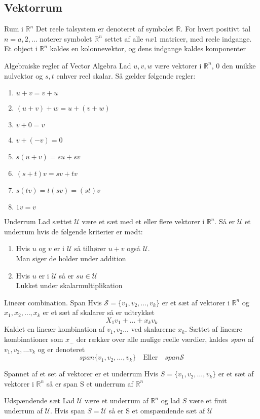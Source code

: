 \documentclass[a4paper,fleqn]{article}
\newcommand{\RR}{\mathbb{R}}
\newcommand{\U}{\mathcal{U}}
\begin{document}
	\subsection{Vektorrum}
	\begin{definition}{Rum i $\RR^n$}{}
		Det reele talsystem er denoteret af symbolet $\RR$. For hvert positivt tal
		$n = a,2,\dots$ noterer symbolet $\RR^n$ settet af alle $n x 1$ matricer, med
		reele indgange. Et object i $\RR^n$ kaldes en kolonnevektor, og dens indgange
		kaldes komponenter
	\end{definition}
	\begin{theorem}{Algebraiske regler af Vector Algebra}{}
		Lad $u,v,w$ være vektorer i $\RR^n$, $0$ den unikke nulvektor og $s,t$ enhver reel
		skalar. Så gælder følgende regler:
		\begin{enumerate}
			\item $u + v = v + u$
			\item $(u+v)+w = u + (v + w)$
			\item $v + 0 = v$
			\item $v + (-v) = 0$
			\item $s(u+v) = su+sv$
			\item $(s+t)v = sv + tv$
			\item $s(tv) = t(sv) = (st)v$
			\item $1v = v$
		\end{enumerate}
	\end{theorem}
	\begin{definition}{Underrum}{}
		Lad sættet $\U$ være et sæt med et eller flere vektorer i $\RR^n$. Så er $\U$ et
		underrum hvis de følgende kriterier er mødt:
		\begin{enumerate}
			\item Hvis $u$ og $v$ er i $\U$ så tilhører $u+v$ også $\U$.\\
				Man siger de holder under addition
			\item Hvis $u$ er i $\U$ så er $su \in \U$\\
				Lukket under skalarmultiplikation
		\end{enumerate}
	\end{definition}
	\begin{definition}{Lineær combination. Span}{}
		Hvis $\mathcal{S} = \{ v_1, v_2, \dots, v_k\}$ er et sæt af vektorer i $\RR^n$
		og $x_1, x_2, \dots, x_k$ er et sæt af skalarer så er udtrykket
		\[ X_1v_1 + \dots + x_kv_k \] Kaldet en lineær kombination af $v_1, v_2 \dots$ ved
		skalarerne $x_k$. Sættet af lineære kombinationer som $x_{\dots}$ der rækker over 
		alle mulige reelle værdier, kaldes $span$ af $v_1, v_2, \dots v_k$ og er denoteret
		\[ span \{ v_1, v_2, \dots, v_k\} \quad \text{Eller}\quad span \mathcal{S} \]
	\end{definition}
	\begin{theorem}{Spannet af et set af vektorer er et underrum}{}
		Hvis $S = \{ v_1, v_2, \dots, v_k\}$ er et sæt af vektorer i $\RR^n$ så er span S
		et underrum af $\RR^n$
	\end{theorem}
	\begin{definition}{Udspændende sæt}{}
		Lad $\U$ være et underrum af $\RR^n$ og lad $S$ være et finit underrum af $\U$.
		Hvis span $S = \U$ så er S et omspændende sæt af $\U$
	\end{definition}
\end{document}
